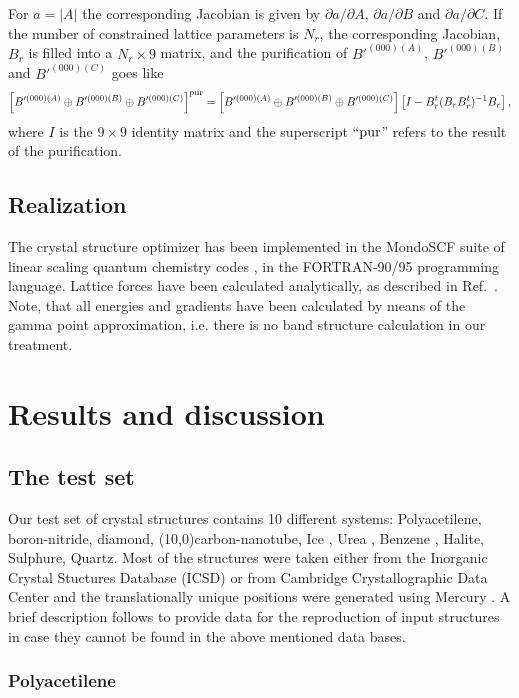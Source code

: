 \documentclass[prl,aps,preprint,superbib,12pt]{revtex4}
\begin{document}
For $a=|A|$ the corresponding Jacobian is given by 
$\partial a / \partial A$, $\partial a / \partial B$ 
and $\partial a / \partial C$.
If the number of constrained lattice parameters is $N_{r}$,
the corresponding Jacobian, $B_{r}$ is filled into a 
$N_{r} \times 9$ matrix, and the purification of 
$B'^{(000)(A)}$, $B'^{(000)(B)}$ and $B'^{(000)(C)}$
goes like
\begin{equation}
\left[ B'^{(000)(A)} \oplus B'^{(000)(B)} \oplus B'^{(000)(C)} \right]^{\rm pur} =
\left[ B'^{(000)(A)} \oplus B'^{(000)(B)} \oplus B'^{(000)(C)} \right]
\left[ I-B_{r}^{t}(B_{r}B_{r}^{t})^{-1}B_{r} \right] ,
\end{equation}
where $I$ is the $9 \times 9$ identity matrix and the superscript  
``${\rm pur}$'' refers to the result of the purification.

\subsection{Realization}
The crystal structure optimizer has been implemented in the
MondoSCF suite of linear scaling quantum chemistry codes 
\cite{MondoSCF}, in the FORTRAN-90/95 programming language.
Lattice forces have been calculated analytically, as described in 
Ref.~\cite{CJTymczak04LatF}. Note, that all energies and gradients
have been calculated by means of the gamma point approximation,
i.e. there is no band structure calculation in our treatment.

\section{Results and discussion}
\subsection{The test set}
Our test set of crystal structures contains
10 different systems:
Polyacetilene, boron-nitride, diamond, (10,0)carbon-nanotube,
Ice \cite{AGoto90}, Urea \cite{SSwaminathan84}, 
Benzene \cite{GJeffrey87}, Halite, Sulphure, Quartz.
Most of the structures were
taken either from the Inorganic Crystal Stuctures Database
(ICSD) \cite{ICSD} or from Cambridge Crystallographic Data Center
\cite{CCDC} and the translationally unique positions were
generated using Mercury \cite{Mercury}. 
A brief description follows to provide data for the reproduction
of input structures in case they cannot be found
in the above mentioned data bases. 

\subsubsection{Polyacetilene}



\end{document}
